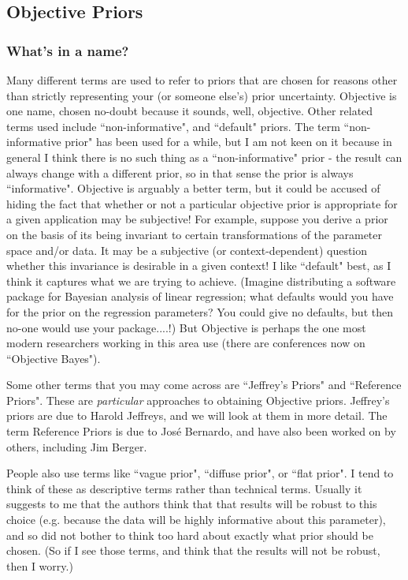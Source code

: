 \documentclass[12pt]{article}
\begin{document}
\subsection{Objective Priors}

\subsubsection{What's in a name?}

Many different terms are used to refer to 
priors that are chosen for reasons other than
strictly representing your (or someone else's) prior uncertainty. Objective is one name, chosen
no-doubt because it sounds, well, objective. 
Other related terms used include ``non-informative", and ``default" priors. The term ``non-informative prior" has been used for a while, but I am not keen on it because in general I think there is no such thing as a ``non-informative" prior - the result can always change with a different prior, so in that sense the prior is always ``informative".  
Objective is arguably a better term, but it could
be accused of hiding the fact that whether or not a particular objective prior is appropriate for a given
application may be subjective! For example, suppose you derive a prior on the basis of its being invariant to
certain transformations of the parameter space and/or data. It may be a subjective (or context-dependent) question whether this invariance is desirable in a given context!
I like ``default" best, as I think it captures what we are trying to achieve. (Imagine distributing a software package for Bayesian analysis of linear regression; what defaults would you have for the prior on the regression parameters? You could
give no defaults, but then no-one would use your package....!) But
Objective is perhaps the one most modern researchers working in this area use (there are
conferences now on ``Objective Bayes"). 

Some other terms that you may come across are ``Jeffrey's Priors" and ``Reference Priors". These are {\it particular} approaches to obtaining Objective priors. Jeffrey's priors are due to 
Harold Jeffreys, and we will look at them in more detail. The term Reference Priors is due to Jos\'e Bernardo, and have also been worked on by others, including Jim Berger.

People also use terms like ``vague prior", ``diffuse prior", or ``flat prior". I tend to think of these as
descriptive terms rather than technical terms. Usually it suggests to me that the authors think
that that results will be robust to this choice (e.g. because the data will be highly informative about this parameter), and so did not bother to think too hard about exactly what prior should be chosen.
(So if I see those terms, and think that the results
will not be robust, then I worry.)
\end{document}
